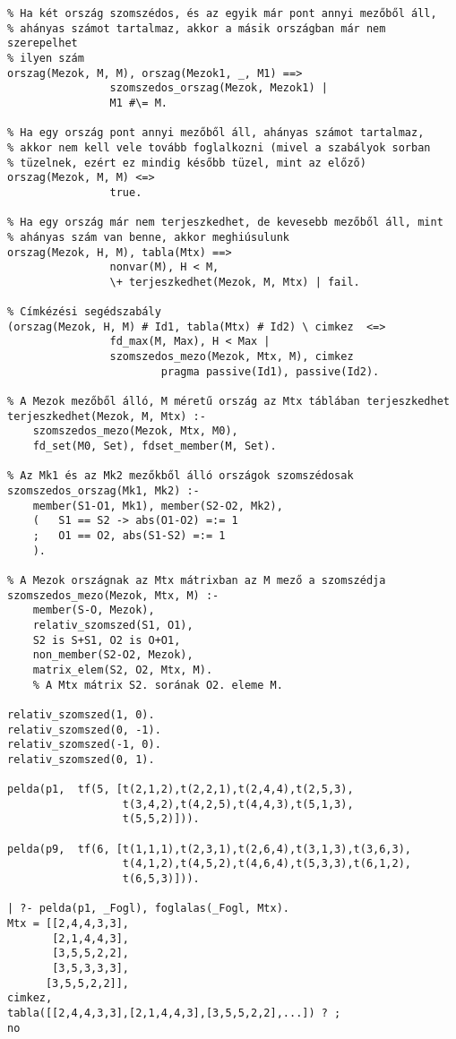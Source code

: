 \begin{verbatim}
% Ha két ország szomszédos, és az egyik már pont annyi mezőből áll,
% ahányas számot tartalmaz, akkor a másik országban már nem szerepelhet
% ilyen szám
orszag(Mezok, M, M), orszag(Mezok1, _, M1) ==>
                szomszedos_orszag(Mezok, Mezok1) |
                M1 #\= M.

% Ha egy ország pont annyi mezőből áll, ahányas számot tartalmaz,
% akkor nem kell vele tovább foglalkozni (mivel a szabályok sorban
% tüzelnek, ezért ez mindig később tüzel, mint az előző)
orszag(Mezok, M, M) <=> 
                true.

% Ha egy ország már nem terjeszkedhet, de kevesebb mezőből áll, mint
% ahányas szám van benne, akkor meghiúsulunk
orszag(Mezok, H, M), tabla(Mtx) ==>
                nonvar(M), H < M, 
                \+ terjeszkedhet(Mezok, M, Mtx) | fail.

% Címkézési segédszabály
(orszag(Mezok, H, M) # Id1, tabla(Mtx) # Id2) \ cimkez  <=>
                fd_max(M, Max), H < Max | 
                szomszedos_mezo(Mezok, Mtx, M), cimkez
                        pragma passive(Id1), passive(Id2).

% A Mezok mezőből álló, M méretű ország az Mtx táblában terjeszkedhet
terjeszkedhet(Mezok, M, Mtx) :-
    szomszedos_mezo(Mezok, Mtx, M0),
    fd_set(M0, Set), fdset_member(M, Set).

% Az Mk1 és az Mk2 mezőkből álló országok szomszédosak
szomszedos_orszag(Mk1, Mk2) :-
    member(S1-O1, Mk1), member(S2-O2, Mk2),
    (   S1 == S2 -> abs(O1-O2) =:= 1
    ;   O1 == O2, abs(S1-S2) =:= 1
    ).

% A Mezok országnak az Mtx mátrixban az M mező a szomszédja
szomszedos_mezo(Mezok, Mtx, M) :-
    member(S-O, Mezok),
    relativ_szomszed(S1, O1),
    S2 is S+S1, O2 is O+O1,
    non_member(S2-O2, Mezok),
    matrix_elem(S2, O2, Mtx, M).   
    % A Mtx mátrix S2. sorának O2. eleme M.

relativ_szomszed(1, 0).
relativ_szomszed(0, -1).
relativ_szomszed(-1, 0).
relativ_szomszed(0, 1).

pelda(p1,  tf(5, [t(2,1,2),t(2,2,1),t(2,4,4),t(2,5,3),
                  t(3,4,2),t(4,2,5),t(4,4,3),t(5,1,3),
                  t(5,5,2)])).                        

pelda(p9,  tf(6, [t(1,1,1),t(2,3,1),t(2,6,4),t(3,1,3),t(3,6,3),
                  t(4,1,2),t(4,5,2),t(4,6,4),t(5,3,3),t(6,1,2),
                  t(6,5,3)])).                                 

| ?- pelda(p1, _Fogl), foglalas(_Fogl, Mtx).
Mtx = [[2,4,4,3,3],
       [2,1,4,4,3],
       [3,5,5,2,2],
       [3,5,3,3,3],
      [3,5,5,2,2]],
cimkez,
tabla([[2,4,4,3,3],[2,1,4,4,3],[3,5,5,2,2],...]) ? ;
no
\end{verbatim}
